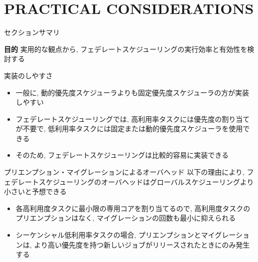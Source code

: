 
\section{PRACTICAL CONSIDERATIONS}
\label{sec: Practical Considerations}

\begin{frame}{セクションサマリ}
    \begin{itembox}[l]{\textbf{目的}}
        実用的な観点から, フェデレートスケジューリングの実行効率と有効性を検討する
    \end{itembox}
\end{frame}


\begin{frame}{実装のしやすさ}
    \begin{itemize}
        \item 一般に, 動的優先度スケジューラよりも固定優先度スケジューラの方が実装しやすい
        \item フェデレートスケジューリングでは, 高利用率タスクには優先度の割り当てが不要で, 低利用率タスクには固定または動的優先度スケジューラを使用できる
        \item そのため, フェデレートスケジューリングは比較的容易に実装できる
    \end{itemize}
\end{frame}

\begin{frame}{プリエンプション・マイグレーションによるオーバヘッド}
    以下の理由により, フェデレートスケジューリングのオーバヘッドはグローバルスケジューリングより小さいと予想できる
    \begin{itemize}
        \item 各高利用度タスクに最小限の専用コアを割り当てるので, 高利用度タスクのプリエンプションはなく, マイグレーションの回数も最小に抑えられる
        \item シーケンシャル低利用率タスクの場合, プリエンプションとマイグレーションは, より高い優先度を持つ新しいジョブがリリースされたときにのみ発生する
    \end{itemize}
\end{frame}

